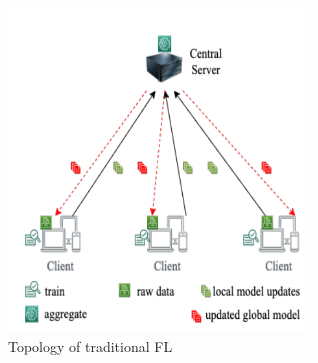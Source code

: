 \documentclass{article}
\begin{document}
\begin{figure}[!ht]
    \centering
    \includegraphics[width=8cm]{assets/topologyFL.PNG}
    \caption{Topology of traditional FL}
    \label{fig:TopologyFL}
\end{figure}
\end{document}
